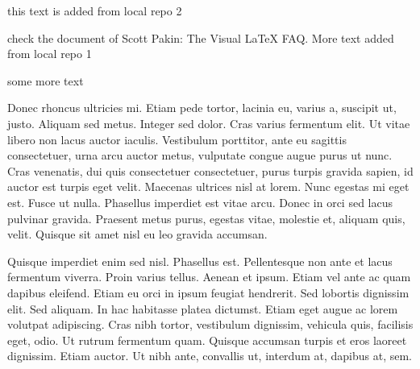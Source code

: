 \documentclass[12pt]{article}
\begin{document}
this text is added from local repo 2



check the document of Scott Pakin: The Visual LaTeX FAQ.
More text added from local repo 1

\vspace{10mm}
some more text


\noindent
Donec rhoncus ultricies mi. Etiam pede tortor, lacinia eu, varius a, suscipit ut, justo. Aliquam sed metus. Integer sed dolor. Cras varius fermentum elit. Ut vitae libero non lacus auctor iaculis. Vestibulum porttitor, ante eu sagittis consectetuer, urna arcu auctor metus, vulputate congue augue purus ut nunc. Cras venenatis, dui quis consectetuer consectetuer, purus turpis gravida sapien, id auctor est turpis eget velit. Maecenas ultrices nisl at lorem. Nunc egestas mi eget est. Fusce ut nulla. Phasellus imperdiet est vitae arcu. Donec in orci sed lacus pulvinar gravida. Praesent metus purus, egestas vitae, molestie et, aliquam quis, velit. Quisque sit amet nisl eu leo gravida accumsan.

Quisque imperdiet enim sed nisl. Phasellus est. Pellentesque non ante et lacus fermentum viverra. Proin varius tellus. Aenean et ipsum. Etiam vel ante ac quam dapibus eleifend. Etiam eu orci in ipsum feugiat hendrerit. Sed lobortis dignissim elit. Sed aliquam. In hac habitasse platea dictumst. Etiam eget augue ac lorem volutpat adipiscing. Cras nibh tortor, vestibulum dignissim, vehicula quis, facilisis eget, odio. Ut rutrum fermentum quam. Quisque accumsan turpis et eros laoreet dignissim. Etiam auctor. Ut nibh ante, convallis ut, interdum at, dapibus at, sem.
\end{document}
